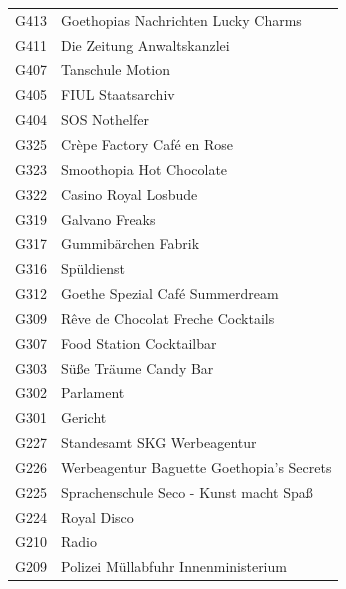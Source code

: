\documentclass[12pt]{article}
\begin{document}
\begin{minipage}{.28\textwidth}
    \begin{framed}
        \begin{tabular}{p{1cm}p{5cm}}
            G413 & Goethopias Nachrichten \newline Lucky Charms \\
            G411 & Die Zeitung \newline Anwaltskanzlei \\
            G407 & Tanschule Motion\\
            G405 & FIUL \newline Staatsarchiv\\
            G404 & SOS Nothelfer \\
            G325 & Crèpe Factory \newline Café en Rose\\
            G323 & Smoothopia \newline Hot Chocolate \\
            G322 & Casino Royal \newline Losbude \\
            G319 & Galvano Freaks \\
            G317 & Gummibärchen Fabrik \\
            G316 & Spüldienst \\
            G312 & Goethe Spezial \newline Café Summerdream \\
            G309 & Rêve de Chocolat \newline Freche Cocktails\\
            G307 & Food Station \newline Cocktailbar \\
            G303 & Süße Träume \newline Candy Bar \\
            G302 & Parlament\\
            G301 & Gericht\\
            G227 & Standesamt \newline SKG Werbeagentur \\
            G226 & Werbeagentur Baguette \newline Goethopia's Secrets \\
            G225 & Sprachenschule \newline Seco - Kunst macht Spaß\\
            G224 & Royal Disco\\
            G210 & Radio \\
            G209 & Polizei \newline Müllabfuhr \newline Innenministerium \\
        \end{tabular}
    \end{framed}
\end{minipage}
\end{document}
